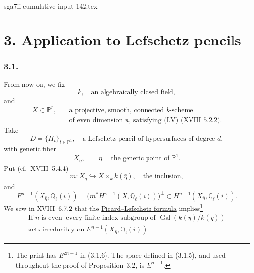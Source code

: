 \begin{filecontents*}{sga7ii-cumulative-input-142.tex}
\section*{3. Application to Lefschetz pencils}

\subsubsection*{3.1.}
From now on, we fix
\begin{equation}\tag{3.1.0}
k,\quad\text{an algebraically closed field},
\end{equation}
and
\begin{equation}\tag{3.1.1}
\begin{aligned}
X\subset\mathbb P^r,\quad
&\text{a projective, smooth, connected }k\text{-scheme}\\
&\text{of even dimension }n\text{, satisfying (LV) (XVIII~5.2.2).}
\end{aligned}
\end{equation}
Take
\begin{equation}\tag{3.1.2}
D=\{H_t\}_{t\in\mathbb P^1},
\quad\text{a Lefschetz pencil of hypersurfaces of degree $d$},
\end{equation}
with generic fiber
\begin{equation}\tag{3.1.3}
X_\eta,\qquad \eta=\text{the generic point of }\mathbb P^1.
\end{equation}
Put (cf.~XVIII~5.4.4)
\begin{equation}\tag{3.1.4}
m:X_{\bar\eta}\hookrightarrow X\times_k k(\bar\eta),
\quad\text{the inclusion},
\end{equation}
and
\begin{equation}\tag{3.1.5}
E^{n-1}(X_{\bar\eta},\mathbb Q_\ell(i))
=\bigl(m^*H^{n-1}(X,\mathbb Q_\ell(i))\bigr)^\perp
\subset H^{n-1}(X_{\bar\eta},\mathbb Q_\ell(i)).
\end{equation}
We saw in XVIII~6.7.2 that the \underline{Picard--Lefschetz formula}
implies\footnote{The print has $E^{2n-1}$ in (3.1.6).  The space defined in
(3.1.5), and used throughout the proof of Proposition~3.2, is
$E^{n-1}$.}
\begin{equation}\tag{3.1.6}
\begin{gathered}
\text{If }n\text{ is even, every finite-index subgroup of }
\operatorname{Gal}(k(\bar\eta)/k(\eta))\\
\text{acts irreducibly on }E^{n-1}(X_{\bar\eta},\mathbb Q_\ell(i)).
\end{gathered}
\end{equation}


\end{filecontents*}
